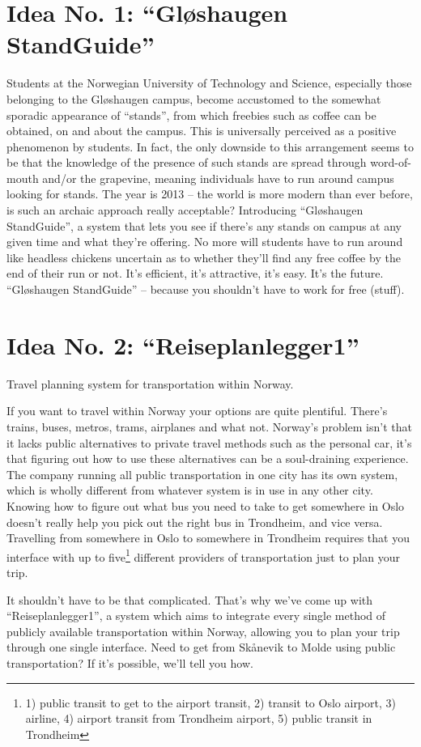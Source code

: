 \section{Idea No. 1: ``Gløshaugen StandGuide''}
	Students at the Norwegian University of Technology and Science, 
	especially those belonging to the Gløshaugen campus, 
	become accustomed to the somewhat sporadic appearance of ``stands'', 
	from which freebies such as coffee can be obtained, on and about the campus.
	This is universally perceived as a positive phenomenon by students.
	In fact, the only downside to this arrangement seems to be that the knowledge of the presence of such stands are spread through word-of-mouth and/or the grapevine,
	meaning individuals have to run around campus looking for stands.
	The year is 2013 -- the world is more modern than ever before, 
	is such an archaic approach really acceptable?
	Introducing ``Gløshaugen StandGuide'', a system that lets you see if there's any stands on campus at any given time and what they're offering.
	No more will students have to run around like headless chickens uncertain as to whether they'll find any free coffee by the end of their run or not.
	It's efficient, it's attractive, it's easy.
	It's the future.
	``Gløshaugen StandGuide'' -- because you shouldn't have to work for free (stuff).

\section{Idea No. 2: ``Reiseplanlegger1''}
	Travel planning system for transportation within Norway.

	If you want to travel within Norway your options are quite plentiful.
	There's trains, buses, metros, trams, airplanes and what not.
	Norway's problem isn't that it lacks public alternatives to private travel methods such as the personal car, 
	it's that figuring out how to use these alternatives can be a soul-draining experience.
	The company running all public transportation in one city has its own system,
	which is wholly different from whatever system is in use in any other city.
	Knowing how to figure out what bus you need to take to get somewhere in Oslo doesn't really help you pick out the right bus in Trondheim, and vice versa.
	Travelling from somewhere in Oslo to somewhere in Trondheim requires that you interface with up to five\footnote{1) public transit to get to the airport transit, 2) transit to Oslo airport, 3) airline, 4) airport transit from Trondheim airport, 5) public transit in Trondheim} different providers of transportation just to plan your trip.

	It shouldn't have to be that complicated.
	That's why we've come up with ``Reiseplanlegger1'',
	a system which aims to integrate every single method of publicly available transportation within Norway, 
	allowing you to plan your trip through one single interface. 
	Need to get from Skånevik to Molde using public transportation?
	If it's possible, we'll tell you how.